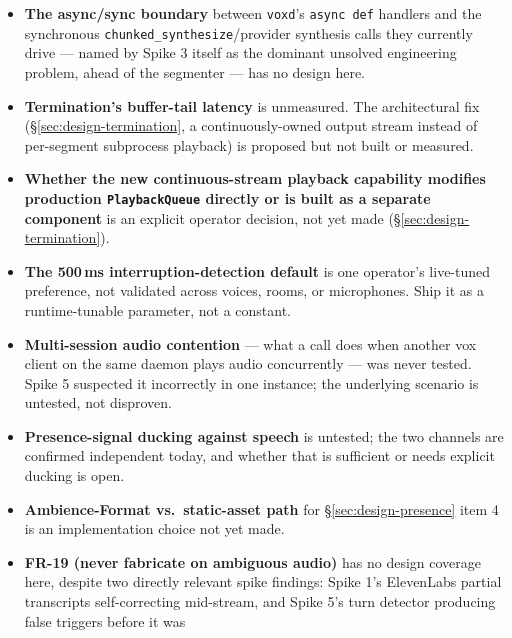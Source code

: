 \documentclass[a4paper,11pt]{report}
\newcommand{\fr}[1]{\textbf{FR-#1}}
\begin{document}
\begin{itemize}
    ElevenLabs SDK directly rather than go through any abstraction.
    \fr{21} requires the capture/recognition/turn-taking/synthesis
    interface boundary to be defined without assuming ElevenLabs is the
    only implementation, and nothing in this chapter sketches what that
    boundary looks like. Silently treating this as solved would be
    wrong; it has not been attempted.
  \item \textbf{The async/sync boundary} between \texttt{voxd}'s
    \texttt{async def} handlers and the synchronous
    \texttt{chunked\_synthesize}/provider synthesis calls they currently
    drive --- named by Spike 3 itself as the dominant unsolved
    engineering problem, ahead of the segmenter --- has no design here.
  \item \textbf{Termination's buffer-tail latency} is unmeasured. The
    architectural fix (\S\ref{sec:design-termination}, a continuously-owned
    output stream instead of per-segment subprocess playback) is proposed
    but not built or measured.
  \item \textbf{Whether the new continuous-stream playback capability
    modifies production \texttt{PlaybackQueue} directly or is built as a
    separate component} is an explicit operator decision, not yet made
    (\S\ref{sec:design-termination}).
  \item \textbf{The 500\,ms interruption-detection default} is one
    operator's live-tuned preference, not validated across voices, rooms,
    or microphones. Ship it as a runtime-tunable parameter, not a
    constant.
  \item \textbf{Multi-session audio contention} --- what a call does when
    another vox client on the same daemon plays audio concurrently --- was
    never tested. Spike 5 suspected it incorrectly in one instance; the
    underlying scenario is untested, not disproven.
  \item \textbf{Presence-signal ducking against speech} is untested; the
    two channels are confirmed independent today, and whether that is
    sufficient or needs explicit ducking is open.
  \item \textbf{Ambience-Format vs.\ static-asset path} for
    \S\ref{sec:design-presence} item 4 is an implementation choice not
    yet made.
  \item \textbf{FR-19 (never fabricate on ambiguous audio)} has no design
    coverage here, despite two directly relevant spike findings: Spike
    1's ElevenLabs partial transcripts self-correcting mid-stream, and
    Spike 5's turn detector producing false triggers before it was

\end{itemize}
\end{document}
